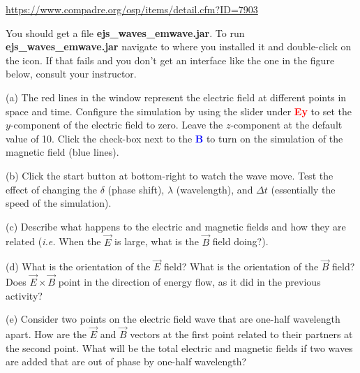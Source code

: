 \url{https://www.compadre.org/osp/items/detail.cfm?ID=7903}

\noindent You should get a file {\bf ejs\_waves\_emwave.jar}.
To run {\bf ejs\_waves\_emwave.jar} navigate to where you installed it and double-click on the icon. 
If that fails and you don't get an interface like the one in the figure below, consult your instructor. 

(a) The red lines in the window represent the electric field at different points in space and time.
Configure the simulation by using the slider under \textcolor{red}{\bf Ey} to  set the $y$-component of 
the electric field to zero. 
Leave the $z$-component at the default value of 10.
Click the check-box next to the \textcolor{blue}{\bf B} to turn on the 
simulation of the magnetic field (blue lines).

(b) Click the start button at bottom-right to watch the wave move.
Test the effect of changing the $\delta$ (phase shift), $\lambda$ (wavelength), and $\Delta t$ 
(essentially the speed of the simulation).


(c) Describe what happens to the electric and magnetic fields and how they are related
({\it i.e.} When the $\vec {E}$ is large, what is the $\vec {B}$ field doing?).
\answerspace{20mm}

(d) What is the orientation of the $\vec {E}$ field?
What is the orientation of the $\vec {B}$ field?
Does $\vec {E} \times \vec {B}$ point in the direction of energy flow, 
as it did in the previous activity?
\answerspace{20mm}

(e) Consider two points on the electric field wave that are one-half wavelength apart.
How are the $\vec {E}$ and $\vec {B}$ vectors at the first point related to their partners 
at the second point.
What will be the total electric and magnetic fields if two waves are added that are out of phase
by one-half wavelength?
\answerspace{20mm}

